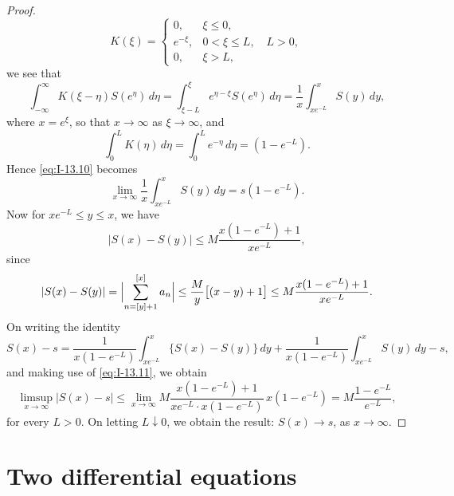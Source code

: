 \begin{proof}
\begin{equation*}
K(\xi)=
\begin{cases}
0,&\xi\le 0,\\
e^{-\xi},&0<\xi\le L,\quad L>0,\\
0,&\xi>L,
\end{cases}
\end{equation*}
we see that
\begin{equation*}
\int_{-\infty}^{\infty}K(\xi-\eta)S(e^\eta)\,d\eta
=\int_{\xi-L}^{\xi}e^{\eta-\xi}S(e^\eta)\,d\eta
=\frac{1}{x}\int_{xe^{-L}}^{x}S(y)\,dy,
\end{equation*}
where $x=e^\xi$, so that $x\to\infty$ as $\xi\to\infty$, and
\begin{equation*}
\int_{0}^{L}K(\eta)\,d\eta=\int_{0}^{L}e^{-\eta}\,d\eta=(1-e^{-L}).
\end{equation*}
Hence \eqref{eq:I-13.10} becomes
\begin{equation}\label{eq:I-13.11}\tag{13.11}
\lim_{x\to\infty}\frac{1}{x}\int_{xe^{-L}}^{x}S(y)\,dy=s(1-e^{-L}).
\end{equation}
Now for $xe^{-L}\le y\le x$, we have
\begin{equation*}
|S(x)-S(y)|\le M\frac{x(1-e^{-L})+1}{xe^{-L}},
\end{equation*}
since
\begin{equation*}
|S(x)-S(y)|
=\Bigl|\sum_{n=[y]+1}^{[x]}a_n\Bigr|
\le\frac{M}{y}\bigl[(x-y)+1\bigr]
\le M\frac{x(1-e^{-L})+1}{xe^{-L}}.
\end{equation*}
On writing the identity
\begin{equation*}
S(x)-s=\frac{1}{x(1-e^{-L})}\int_{xe^{-L}}^{x}\{S(x)-S(y)\}\,dy+\frac{1}{x(1-e^{-L})}\int_{xe^{-L}}^{x}S(y)\,dy-s,
\end{equation*}
and making use of \eqref{eq:I-13.11}, we obtain
\begin{equation*}
\limsup_{x\to\infty}|S(x)-s|
\le\lim_{x\to\infty}M\frac{x(1-e^{-L})+1}{xe^{-L}\cdot x(1-e^{-L})}\,x(1-e^{-L})
=M\frac{1-e^{-L}}{e^{-L}},
\end{equation*}
for every $L>0$. On letting $L\downarrow 0$, we obtain the result: $S(x)\to s$, as $x\to\infty$.
\end{proof}

\section{Two differential equations}
\label{sec:I-14}

